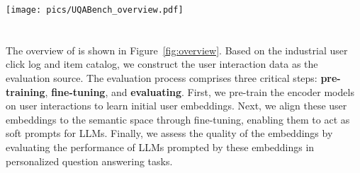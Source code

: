 \begin{figure*}[t]
    \centering
    \texttt{[image: pics/UQABench\_overview.pdf]}
    \caption{
    An overview of the standardized evaluation process of user embeddings on \name. The left-bottom part demonstrates the encoder model encodes the historical interactions into user embeddings, which requires pre-training. The left-top part shows that user embeddings act as the soft prompt for LLMs to generate personalized responses, which needs fine-tuning. The right side demonstrates the proposed tasks in the evaluating stage and the corresponding Q\&A demo.  
    }
    \label{fig:overview}
\end{figure*}

\section{\name}
The overview of \name is shown in Figure~\ref{fig:overview}. Based on the industrial user click log and item catalog, we construct the user interaction data as the evaluation source. The evaluation process comprises three critical steps: \textbf{pre-training}, \textbf{fine-tuning}, and \textbf{evaluating}. 
First, we pre-train the encoder models on user interactions to learn initial user embeddings.
Next, we align these user embeddings to the semantic space through fine-tuning, enabling them to act as soft prompts for LLMs. Finally, we assess the quality of the embeddings by evaluating the performance of LLMs prompted by these embeddings in personalized question answering tasks.

